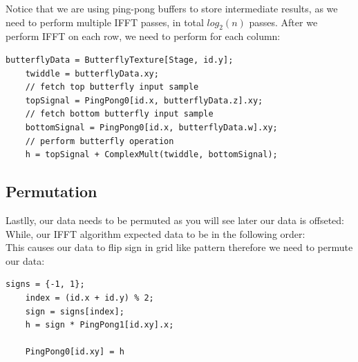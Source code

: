 Notice that we are using ping-pong buffers to store intermediate results, as we need to perform multiple IFFT passes, in total $log_2(n)$ passes.
After we perform IFFT on each row, we need to perform for each column:
\begin{lstlisting}[caption={Vertical Butterfly Operation}, frame=single, numberstyle=\small\color{gray}, captionpos=b]
    butterflyData = ButterflyTexture[Stage, id.y];
    twiddle = butterflyData.xy;
    // fetch top butterfly input sample
    topSignal = PingPong0[id.x, butterflyData.z].xy;
    // fetch bottom butterfly input sample
    bottomSignal = PingPong0[id.x, butterflyData.w].xy;
    // perform butterfly operation
    h = topSignal + ComplexMult(twiddle, bottomSignal);
\end{lstlisting}

\subsection*{Permutation}
Lastlly, our data needs to be permuted as you will see later our data is offseted:
\begin{equation}
    [\text{freq} (-N / 2), \text{ ...}, \text{ freq} (-1), \text{ freq} (0), \text{ freq} (1), \text{ ...}, \text{ freq} (N / 2 - 1)]
\end{equation}
While, our IFFT algorithm expected data to be in the following order:
\begin{equation}
    [\text{freq} (0), \text{ freq} (1), \text{ ...}, \text{ freq}(N - 1)]
\end{equation}
This causes our data to flip sign in grid like pattern therefore we need to permute our data:
\begin{lstlisting}[caption={Data Permutation \cite{flugge2017} }, frame=single, numberstyle=\small\color{gray}, captionpos=b]
    signs = {-1, 1};
    index = (id.x + id.y) % 2;
    sign = signs[index];
    h = sign * PingPong1[id.xy].x;
    
    PingPong0[id.xy] = h
\end{lstlisting}


